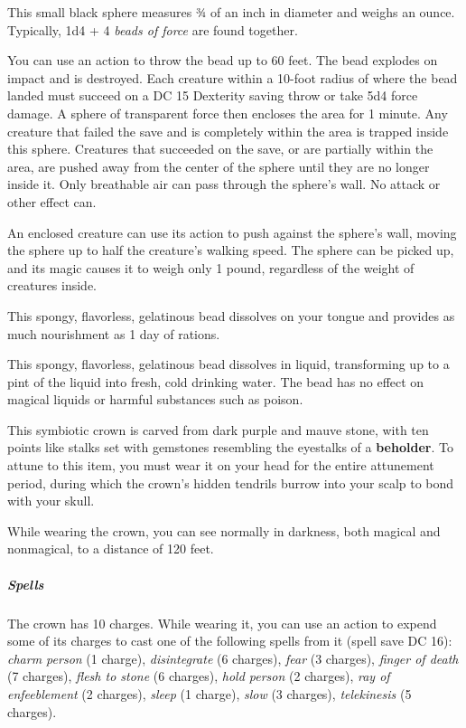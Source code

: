 \documentclass[10pt,a4paper,twoside,bg=print,twocolumn,openany,nodeprecatedcode]{dndbook}
\begin{document}
This small black sphere measures ¾ of an inch in diameter and weighs an ounce. Typically, 1d4 + 4 \textit{beads of force} are found together.

You can use an action to throw the bead up to 60 feet. The bead explodes on impact and is destroyed. Each creature within a 10-foot radius of where the bead landed must succeed on a DC 15 Dexterity saving throw or take 5d4 force damage. A sphere of transparent force then encloses the area for 1 minute. Any creature that failed the save and is completely within the area is trapped inside this sphere. Creatures that succeeded on the save, or are partially within the area, are pushed away from the center of the sphere until they are no longer inside it. Only breathable air can pass through the sphere's wall. No attack or other effect can.

An enclosed creature can use its action to push against the sphere's wall, moving the sphere up to half the creature's walking speed. The sphere can be picked up, and its magic causes it to weigh only 1 pound, regardless of the weight of creatures inside.

This spongy, flavorless, gelatinous bead dissolves on your tongue and provides as much nourishment as 1 day of rations.

This spongy, flavorless, gelatinous bead dissolves in liquid, transforming up to a pint of the liquid into fresh, cold drinking water. The bead has no effect on magical liquids or harmful substances such as poison.

This symbiotic crown is carved from dark purple and mauve stone, with ten points like stalks set with gemstones resembling the eyestalks of a \textbf{beholder}. To attune to this item, you must wear it on your head for the entire attunement period, during which the crown's hidden tendrils burrow into your scalp to bond with your skull.

While wearing the crown, you can see normally in darkness, both magical and nonmagical, to a distance of 120 feet.

\subparagraph{Spells}
The crown has 10 charges. While wearing it, you can use an action to expend some of its charges to cast one of the following spells from it (spell save DC 16): \textit{charm person} (1 charge), \textit{disintegrate} (6 charges), \textit{fear} (3 charges), \textit{finger of death} (7 charges), \textit{flesh to stone} (6 charges), \textit{hold person} (2 charges), \textit{ray of enfeeblement} (2 charges), \textit{sleep} (1 charge), \textit{slow} (3 charges), \textit{telekinesis} (5 charges).
\end{document}
